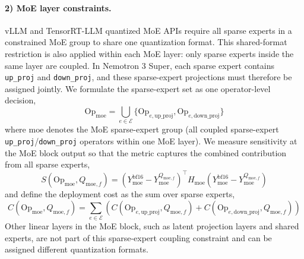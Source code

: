 \paragraph{2) MoE layer constraints.}
vLLM and TensorRT-LLM quantized MoE APIs require all sparse experts in a constrained MoE group to share one quantization format. This shared-format restriction is also applied within each MoE layer: only sparse experts inside the same layer are coupled. In Nemotron 3 Super, each sparse expert contains \texttt{up\_proj} and \texttt{down\_proj}, and these sparse-expert projections must therefore be assigned jointly. We formulate the sparse-expert set as one operator-level decision,
\[
\mathrm{Op}_{\mathrm{moe}} = \bigcup_{e \in \mathcal{E}} \{\mathrm{Op}_{e,\mathrm{up\_proj}}, \mathrm{Op}_{e,\mathrm{down\_proj}}\}
\]
where \(\mathrm{moe}\) denotes the MoE sparse-expert group (all coupled sparse-expert \texttt{up\_proj}/\texttt{down\_proj} operators within one MoE layer).
We measure sensitivity at the MoE block output so that the metric captures the combined contribution from all sparse experts,
\[
S(\mathrm{Op}_{\mathrm{moe}}, Q_{\mathrm{moe},f}) = \left(Y_{\mathrm{moe}}^{\mathrm{bf16}} - Y_{\mathrm{moe}}^{Q_{\mathrm{moe},f}}\right)^\top H_{\mathrm{moe}} \left(Y_{\mathrm{moe}}^{\mathrm{bf16}} - Y_{\mathrm{moe}}^{Q_{\mathrm{moe},f}}\right)
\]
and define the deployment cost as the sum over sparse experts,
\[
C(\mathrm{Op}_{\mathrm{moe}}, Q_{\mathrm{moe},f}) = \sum_{e \in \mathcal{E}} \left(C(\mathrm{Op}_{e,\mathrm{up\_proj}}, Q_{\mathrm{moe},f}) + C(\mathrm{Op}_{e,\mathrm{down\_proj}}, Q_{\mathrm{moe},f})\right)
\]
Other linear layers in the MoE block, such as latent projection layers and shared experts, are not part of this sparse-expert coupling constraint and can be assigned different quantization formats.